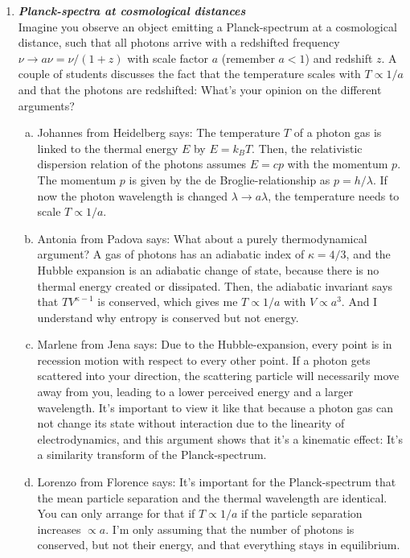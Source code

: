 \documentclass[a4paper,12pt]{article}
\newcommand{\question}[1]{\textbf{\textit{#1}}}
\begin{document}
\begin{enumerate}
\item \question{Planck-spectra at cosmological distances}\\
Imagine you observe an object emitting a Planck-spectrum at a cosmological distance, such that all photons arrive with a redshifted frequency $\nu\rightarrow a\nu=\nu / (1+z)$ with scale factor $a$ (remember $a<1$) and redshift $z$. A couple of students discusses the fact that the temperature scales with $T\propto 1/a$ and that the photons are redshifted: What's your opinion on the different arguments?
\begin{enumerate}[(a)]
\item{Johannes from Heidelberg says: The temperature $T$ of a photon gas is linked to the thermal energy $E$ by $E=k_BT$. Then, the relativistic dispersion relation of the photons assumes $E = cp$ with the momentum $p$. The momentum $p$ is given by the de Broglie-relationship as $p=h/\lambda$. If now the photon wavelength is changed $\lambda\rightarrow a\lambda$, the temperature needs to scale $T\propto 1/a$.}
\item{Antonia from Padova says: What about a purely thermodynamical argument? A gas of photons has an adiabatic index of $\kappa=4/3$, and the Hubble expansion is an adiabatic change of state, because there is no thermal energy created or dissipated. Then, the adiabatic invariant says that $TV^{\kappa-1}$ is conserved, which gives me $T\propto 1/a$ with $V\propto a^3$. And I understand why entropy is conserved but not energy.}
\item{Marlene from Jena says: Due to the Hubble-expansion, every point is in recession motion with respect to every other point. If a photon gets scattered into your direction, the scattering particle will necessarily move away from you, leading to a lower perceived energy and a larger wavelength. It's important to view it like that because a photon gas can not change its state without interaction due to the linearity of electrodynamics, and this argument shows that it's a kinematic effect: It's a similarity transform of the Planck-spectrum.}
\item{Lorenzo from Florence says: It's important for the Planck-spectrum that the mean particle separation and the thermal wavelength are identical. You can only arrange for that if $T\propto 1/a$ if the particle separation increases $\propto a$. I'm only assuming that the number of photons is conserved, but not their energy, and that everything stays in equilibrium.}
\end{enumerate}


\end{enumerate}
\end{document}
